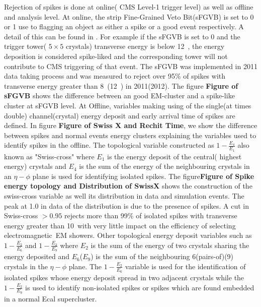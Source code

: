Rejection of spikes is done at online( CMS Level-1 trigger level) as well as offline and analysis level.
\newline
At online, the strip Fine-Grained Veto Bit(sFGVB) is set to 0 or 1 use to flagging an object as either a spike or a good event respectively. A detail of this can be found in \cite{spike2}. For example if the sFGVB is set to 0 and the  trigger tower( $5 \times 5$ crystals) transverse energy is below 12~\GeV, the energy deposition is considered spike-liked and the corresponding tower will not contribute  to CMS triggering of that event. The sFGVB was implemented in 2011 data taking process and was measured to reject over 95\% of spikes with transverse energy greater than 8~\GeV(12~\GeV) in 2011(2012).
The figure {\textbf{Figure of sFGVB}} shows the difference between an good EM-cluster and a spike-like cluster at sFGVB level.
\newline
At Offline, variables making using of the single(at times double) channel(crystal) energy deposit and early arrival time of spikes are defined.
In figure {\textbf{Figure of Swiss X and Rechit Time}}, we show the difference between spikes and normal events energy clusters explaining the variables used to identify spikes in the offline.
The topological variable constructed as $1 - \frac{E_{4}}{E_{1}}$ also known as "Swiss-cross" where $E_{1}$ is the energy deposit of the central( highest energy) crystals and $E_{4}$ is the sum of the energy of the neighbouring crystals in an $\eta - \phi $ plane is used for identifying isolated spikes.
The figure{\textbf{Figure of Spike energy topology and Distribution of SwissX}} shows the construction of the swiss-cross variable as well its distribution in data and simulation events. The peak at 1.0 in data of the distribution is due to the presence of spikes. A cut in Swiss-cross $ > 0.95$ rejects more than 99\% of isolated spikes with transverse energy greater than 10~\GeV with very little impact on the efficiency of selecting electromagnetic~{EM} showers.
Other topological energy deposit variables such as $ 1 - \frac{E_{2}}{E_{6}}$ and $ 1 - \frac{E_{2}}{E_{9}} $ where $E_{2}$ is the sum of the energy of two  crystals sharing the energy deposited and $E_{6}$($E_{9}$) is the sum of the neighbouring 6(pairs-of)(9) crystals in the $\eta - \phi$ plane.
The $ 1 - \frac{E_{2}}{E_{6}} $ variable is used for the identification of  isolated spikes whose energy deposit spread in two adjacent crystals while the  $ 1 - \frac{E_{2}}{E_{9}} $ is used to identify  non-isolated spikes or spikes which are found embedded in a normal Ecal supercluster.

